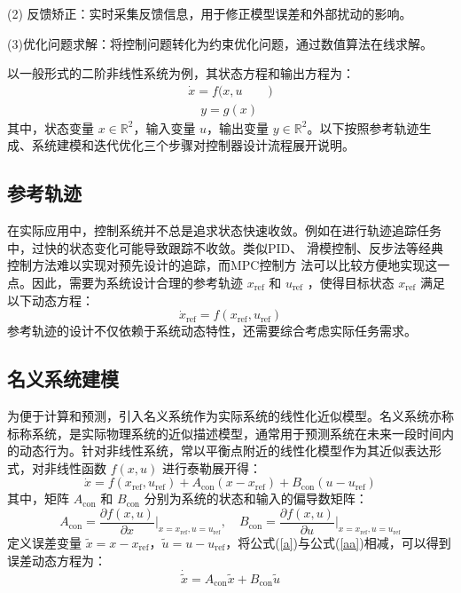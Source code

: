 \documentclass[lang=chs, degree=master, blindreview=false, winfonts=true]{yanputhesis}
\begin{document}
(2) 反馈矫正：实时采集反馈信息，用于修正模型误差和外部扰动的影响。

(3)优化问题求解：将控制问题转化为约束优化问题，通过数值算法在线求解。


以一般形式的二阶非线性系统为例，其状态方程和输出方程为：
\begin{equation}
\begin{aligned}
	\dot{x} = f(x, u&)\\
	\quad y = g(x)&
\end{aligned}
 \label{3-19}
\end{equation}
其中，状态变量 $x \in \mathbb{R}^2$，输入变量 $u$，输出变量 $y \in \mathbb{R}^2$。以下按照参考轨迹生成、系统建模和迭代优化三个步骤对控制器设计流程展开说明。

\subsection{参考轨迹}
在实际应用中，控制系统并不总是追求状态快速收敛。例如在进行轨迹追踪任务中，过快的状态变化可能导致跟踪不收敛。类似PID、
滑模控制、反步法等经典控制方法难以实现对预先设计的追踪，而MPC控制方
法可以比较方便地实现这一点。因此，需要为系统设计合理的参考轨迹 $x_\text{ref}$ 和 $u_\text{ref}$ ，使得目标状态 $x_\text{ref}$ 满足以下动态方程：
\begin{equation}
	\dot{x}_\text{ref} = f(x_\text{ref}, u_\text{ref})
	\label{aa}
\end{equation}
参考轨迹的设计不仅依赖于系统动态特性，还需要综合考虑实际任务需求。

\subsection{名义系统建模}

为便于计算和预测，引入名义系统作为实际系统的线性化近似模型。名义系统亦称标称系统，是实际物理系统的近似描述模型，通常用于预测系统在未来一段时间内的动态行为。针对非线性系统，常以平衡点附近的线性化模型作为其近似表达形式，对非线性函数 $f(x, u)$ 进行泰勒展开得：
\begin{equation}
	\dot{x} = f(x_\text{ref}, u_\text{ref}) + A_\text{con} (x - x_\text{ref}) + B_\text{con} (u - u_\text{ref})
	\label{a}
\end{equation}
其中，矩阵 $A_\text{con}$ 和 $B_\text{con}$ 分别为系统的状态和输入的偏导数矩阵：
\begin{equation}
	A_\text{con} = \frac{\partial f(x, u)}{\partial x} \bigg|_{x = x_\text{ref}, u = u_\text{ref}}, \quad B_\text{con} = \frac{\partial f(x, u)}{\partial u} \bigg|_{x = x_\text{ref}, u = u_\text{ref}}
\end{equation}
定义误差变量 $\tilde{x} = x - x_\text{ref}$，$\tilde{u} = u - u_\text{ref}$，将公式(\ref{a})与公式(\ref{aa})相减，可以得到误差动态方程为：
\begin{equation}
	\dot{\tilde{x}} = A_\text{con} \tilde{x} + B_\text{con} \tilde{u}
\end{equation}
\end{document}
